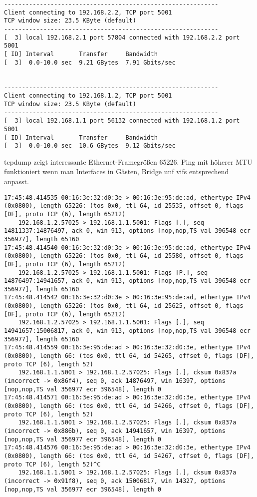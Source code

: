 \setupVerbatimOut
\begin{verbatim}
------------------------------------------------------------
Client connecting to 192.168.2.2, TCP port 5001
TCP window size: 23.5 KByte (default)
------------------------------------------------------------
[  3] local 192.168.2.1 port 57804 connected with 192.168.2.2 port 5001
[ ID] Interval       Transfer     Bandwidth
[  3]  0.0-10.0 sec  9.21 GBytes  7.91 Gbits/sec


------------------------------------------------------------
Client connecting to 192.168.1.2, TCP port 5001
TCP window size: 23.5 KByte (default)
------------------------------------------------------------
[  3] local 192.168.1.1 port 56132 connected with 192.168.1.2 port 5001
[ ID] Interval       Transfer     Bandwidth
[  3]  0.0-10.0 sec  10.6 GBytes  9.12 Gbits/sec
\end{verbatim}
tcpdump zeigt interessante Ethernet-Framegrößen 65226. Ping mit höherer MTU funktioniert wenn man Interfaces in Gästen, Bridge unf vifs entsprechend anpasst.
\setupVerbatimOut
\begin{verbatim}
17:45:48.414535 00:16:3e:32:d0:3e > 00:16:3e:95:de:ad, ethertype IPv4 (0x0800), length 65226: (tos 0x0, ttl 64, id 25535, offset 0, flags [DF], proto TCP (6), length 65212)
    192.168.1.2.57025 > 192.168.1.1.5001: Flags [.], seq 14811337:14876497, ack 0, win 913, options [nop,nop,TS val 396548 ecr 356977], length 65160
17:45:48.414540 00:16:3e:32:d0:3e > 00:16:3e:95:de:ad, ethertype IPv4 (0x0800), length 65226: (tos 0x0, ttl 64, id 25580, offset 0, flags [DF], proto TCP (6), length 65212)
    192.168.1.2.57025 > 192.168.1.1.5001: Flags [P.], seq 14876497:14941657, ack 0, win 913, options [nop,nop,TS val 396548 ecr 356977], length 65160
17:45:48.414542 00:16:3e:32:d0:3e > 00:16:3e:95:de:ad, ethertype IPv4 (0x0800), length 65226: (tos 0x0, ttl 64, id 25625, offset 0, flags [DF], proto TCP (6), length 65212)
    192.168.1.2.57025 > 192.168.1.1.5001: Flags [.], seq 14941657:15006817, ack 0, win 913, options [nop,nop,TS val 396548 ecr 356977], length 65160
17:45:48.414559 00:16:3e:95:de:ad > 00:16:3e:32:d0:3e, ethertype IPv4 (0x0800), length 66: (tos 0x0, ttl 64, id 54265, offset 0, flags [DF], proto TCP (6), length 52)
    192.168.1.1.5001 > 192.168.1.2.57025: Flags [.], cksum 0x837a (incorrect -> 0x86f4), seq 0, ack 14876497, win 16397, options [nop,nop,TS val 356977 ecr 396548], length 0
17:45:48.414571 00:16:3e:95:de:ad > 00:16:3e:32:d0:3e, ethertype IPv4 (0x0800), length 66: (tos 0x0, ttl 64, id 54266, offset 0, flags [DF], proto TCP (6), length 52)
    192.168.1.1.5001 > 192.168.1.2.57025: Flags [.], cksum 0x837a (incorrect -> 0x886b), seq 0, ack 14941657, win 16397, options [nop,nop,TS val 356977 ecr 396548], length 0
17:45:48.414576 00:16:3e:95:de:ad > 00:16:3e:32:d0:3e, ethertype IPv4 (0x0800), length 66: (tos 0x0, ttl 64, id 54267, offset 0, flags [DF], proto TCP (6), length 52)^C
    192.168.1.1.5001 > 192.168.1.2.57025: Flags [.], cksum 0x837a (incorrect -> 0x91f8), seq 0, ack 15006817, win 14327, options [nop,nop,TS val 356977 ecr 396548], length 0
\end{verbatim}






